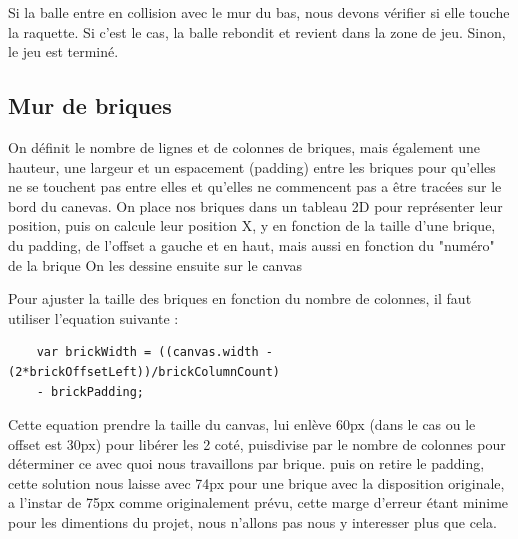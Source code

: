 \documentclass[12pt]{exam}
\begin{document}
Si la balle entre en collision avec le mur du bas, nous devons vérifier si elle touche la raquette. Si c'est le cas, la balle rebondit et revient dans la zone de jeu. Sinon, le jeu est terminé.

\subsection{Mur de briques}
On définit le nombre de lignes et de colonnes de briques, mais également une hauteur, une largeur et un espacement (padding) entre les briques pour qu'elles ne se touchent pas entre elles et qu'elles ne commencent pas a être tracées sur le bord du canevas. On place nos briques dans un tableau 2D pour représenter leur position, puis on calcule leur position X, y en fonction de la taille d'une brique, du padding, de l'offset a gauche et en haut, mais aussi en fonction du "numéro" de la brique
On les dessine ensuite sur le canvas

Pour ajuster la taille des briques en fonction du nombre de colonnes, il faut utiliser l'equation suivante :
\begin{verbatim}
    var brickWidth = ((canvas.width - (2*brickOffsetLeft))/brickColumnCount)
    - brickPadding;
\end{verbatim}
Cette equation prendre la taille du canvas, lui enlève 60px (dans le cas ou le offset est 30px) pour libérer les 2 coté, puisdivise par le nombre de colonnes pour déterminer ce avec quoi nous travaillons par brique. puis on retire le padding, cette solution nous laisse avec 74px pour une brique avec la disposition originale, a l'instar de 75px comme originalement prévu, cette marge d'erreur étant minime pour les dimentions du projet, nous n'allons pas nous y interesser plus que cela.
\end{document}

